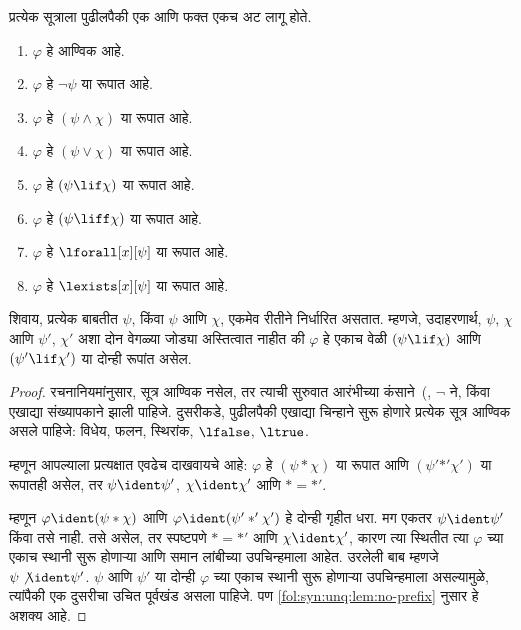 \begin{prop}[एकमेव वाचनीयता]
प्रत्येक सूत्राला पुढीलपैकी एक आणि फक्त एकच अट लागू होते.
\begin{enumerate}
\item $\varphi$ हे आण्विक आहे.

\item $\varphi$ हे $\lnot \psi$ या रूपात आहे.

\item $\varphi$ हे $(\psi \land \chi)$ या रूपात आहे.

\item $\varphi$ हे $(\psi \lor \chi)$ या रूपात आहे.

\item $\varphi$ हे $(\psi \lif \chi)$ या रूपात आहे.

\item $\varphi$ हे $(\psi \liff \chi)$ या रूपात आहे.

\item $\varphi$ हे $\lforall[x][\psi]$ या रूपात आहे.

\item $\varphi$ हे $\lexists[x][\psi]$ या रूपात आहे.
\end{enumerate}
शिवाय, प्रत्येक बाबतीत $\psi$, किंवा $\psi$ आणि $\chi$, एकमेव रीतीने
निर्धारित असतात. म्हणजे, उदाहरणार्थ, $\psi$, $\chi$ आणि $\psi'$, $\chi'$ अशा
दोन वेगळ्या जोड्या अस्तित्वात नाहीत की $\varphi$ हे एकाच वेळी
$(\psi \lif \chi)$ आणि $(\psi' \lif \chi')$ या दोन्ही रूपांत असेल.
\end{prop}

\begin{proof}
रचनानियमांनुसार, सूत्र आण्विक नसेल, तर त्याची सुरुवात आरंभीच्या
कंसाने~(, $\lnot$ ने, किंवा एखाद्या संख्यापकाने झाली
पाहिजे. दुसरीकडे, पुढीलपैकी एखाद्या चिन्हाने सुरू होणारे प्रत्येक
सूत्र आण्विक असले पाहिजे: विधेय, फलन,
स्थिरांक, $\lfalse$, $\ltrue$.

म्हणून आपल्याला प्रत्यक्षात एवढेच दाखवायचे आहे: $\varphi$ हे $(\psi \ast
\chi)$ या रूपात आणि $(\psi' \mathbin{\ast'} \chi')$ या रूपातही असेल, तर
$\psi \ident \psi'$, $\chi \ident \chi'$ आणि $\ast = {\ast'}$.

म्हणून $\varphi \ident (\psi \ast \chi)$ आणि $\varphi \ident (\psi'
\mathbin{\ast'} \chi')$ हे दोन्ही गृहीत धरा. मग एकतर $\psi \ident \psi'$
किंवा तसे नाही. तसे असेल, तर स्पष्टपणे $\ast = {\ast'}$ आणि $\chi
\ident \chi'$, कारण त्या स्थितीत त्या $\varphi$ च्या एकाच स्थानी सुरू होणाऱ्या
आणि समान लांबीच्या उपचिन्हमाला आहेत. उरलेली बाब म्हणजे $\psi
\not\ident \psi'$. $\psi$ आणि $\psi'$ या दोन्ही $\varphi$ च्या एकाच स्थानी सुरू
होणाऱ्या उपचिन्हमाला असल्यामुळे, त्यांपैकी एक दुसरीचा उचित पूर्वखंड
असला पाहिजे. पण \ref{fol:syn:unq:lem:no-prefix} नुसार हे अशक्य आहे.
\end{proof}













